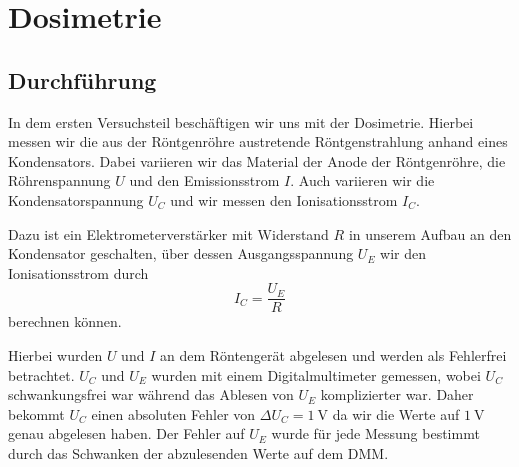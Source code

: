 \documentclass{article}
\begin{document}

\section{Dosimetrie}

\subsection{Durchführung}

In dem ersten Versuchsteil beschäftigen wir uns mit der Dosimetrie. 
Hierbei messen wir die aus der Röntgenröhre austretende Röntgenstrahlung anhand eines Kondensators.
Dabei variieren wir das Material der Anode der Röntgenröhre, die Röhrenspannung $U$ und den Emissionsstrom $I$. 
Auch variieren wir die Kondensatorspannung $U_C$ und wir messen den Ionisationsstrom $I_C$.

Dazu ist ein Elektrometerverstärker mit Widerstand $R$ in unserem Aufbau an den Kondensator geschalten, über dessen Ausgangsspannung $U_E$ wir den Ionisationsstrom durch
\begin{equation}
    I_C = \frac{U_E}{R}
    \label{eq:UE_IC}
\end{equation}
berechnen können.

Hierbei wurden $U$ und $I$ an dem Röntengerät abgelesen und werden als Fehlerfrei betrachtet.
$U_C$ und $U_E$ wurden mit einem Digitalmultimeter gemessen, wobei $U_C$ schwankungsfrei war während das Ablesen von $U_E$ komplizierter war.
Daher bekommt $U_C$ einen absoluten Fehler von $\Delta U_C = \SI{1}{\volt}$ da wir die Werte auf $\SI{1}{\volt}$ genau abgelesen haben.
Der Fehler auf $U_E$ wurde für jede Messung bestimmt durch das Schwanken der abzulesenden Werte auf dem DMM.
\end{document}
